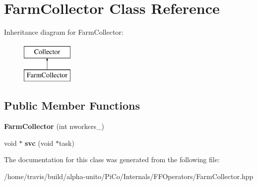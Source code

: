 \hypertarget{class_farm_collector}{\section{\-Farm\-Collector \-Class \-Reference}
\label{class_farm_collector}
}
\-Inheritance diagram for \-Farm\-Collector\-:\begin{figure}[H]
\begin{center}
\leavevmode
\includegraphics[height=2.000000cm]{class_farm_collector}
\end{center}
\end{figure}
\subsection*{\-Public \-Member \-Functions}
\begin{DoxyCompactItemize}
\item 
\hypertarget{class_farm_collector_a1d24578f27f0f90f06b47989317603c4}{{\bfseries \-Farm\-Collector} (int nworkers\-\_\-)}\label{class_farm_collector_a1d24578f27f0f90f06b47989317603c4}

\item 
\hypertarget{class_farm_collector_a60c88418d3df2e0cebd55bbd389148a6}{void $\ast$ {\bfseries svc} (void $\ast$task)}\label{class_farm_collector_a60c88418d3df2e0cebd55bbd389148a6}

\end{DoxyCompactItemize}


\-The documentation for this class was generated from the following file\-:\begin{DoxyCompactItemize}
\item 
/home/travis/build/alpha-\/unito/\-Pi\-Co/\-Internals/\-F\-F\-Operators/\-Farm\-Collector.\-hpp\end{DoxyCompactItemize}
